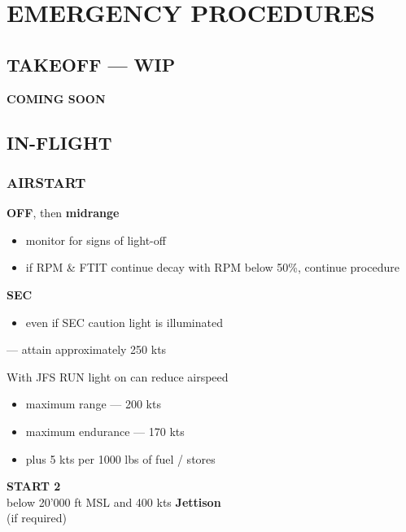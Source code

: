 \chapter[EMERGENCY]{EMERGENCY PROCEDURES}
\localtableofcontents
\thispagestyle{plain}
\cleardoublepage

\section{TAKEOFF --- WIP}

\begin{center}
    \vspace{4em}%
    \Large\titlefont%
    \textbf{COMING SOON}%
\end{center}

\clearpage

\marginfigeometry

\section{IN-FLIGHT}

\subsection{AIRSTART}

\begin{checklistenumerate}
    \blueitem[Throttle]\dotfill \textbf{OFF}, then \textbf{midrange}
    \begin{itemize}
        \item monitor for signs of light-off
        \item if RPM \& FTIT continue decay with RPM below 50\%, continue procedure
    \end{itemize}
    \dotfill \textbf{SEC}
    \begin{itemize}
        \item even if SEC caution light is illuminated
    \end{itemize}
    \blueitem[Airspeed] 
    --- attain approximately 250 kts 

    \medskip
    With JFS RUN light on can reduce airspeed
    \begin{itemize}
        \item maximum range --- 200 kts
        \item maximum endurance --- 170 kts
        \item plus 5 kts per 1000 lbs of fuel / stores 
    \end{itemize}
    \dotfill \textbf{START 2}\\
    \hfill below 20'000 ft MSL and 400 kts
    \blueitem[STORES]\dotfill \textbf{Jettison}\\
    \hfill (if required)
\end{checklistenumerate}


